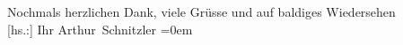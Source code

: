 \pstart
           Nochmals herzlichen Dank, viele Grüsse und auf baldiges Wiedersehen{\\[\baselineskip]}{[}hs.:{]} Ihr
                  \spacefill\mbox{Arthur Schnitzler}\pend
           \leftskip=0em{}\endnumbering{}
\begin{anhang}
\end{anhang}
      